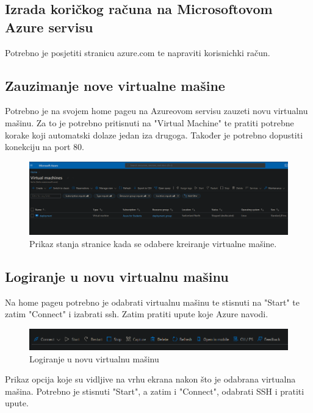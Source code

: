     \subsection{Izrada koričkog računa na Microsoftovom Azure servisu}
    Potrebno je posjetiti stranicu azure.com te napraviti korisnichki račun.

    \subsection{Zauzimanje nove virtualne mašine}
    Potrebno je na svojem home pageu na Azureovom servisu zauzeti novu virtualnu mašinu. Za to je potrebno pritisnuti na "Virtual Machine" te pratiti potrebne korake koji automatski dolaze jedan iza drugoga. Također je potrebno dopustiti konekciju na port 80.
    \begin{figure}[H]
        \includegraphics[width=\textwidth]{slike/deploy/create_vm.png} %
        \caption{Prikaz stanja stranice kada se odabere kreiranje virtualne mašine.}
        \label{fig:struktura} %
    \end{figure}

    \subsection{Logiranje u novu virtualnu mašinu}
    Na home pageu potrebno je odabrati virtualnu mašinu te stisnuti na "Start" te zatim "Connect" i izabrati ssh. Zatim pratiti upute koje Azure navodi.
    \begin{figure}[H]
        \includegraphics[width=\textwidth]{slike/deploy/connect.png} %
        \caption{Logiranje u novu virtualnu mašinu}
        \label{fig:struktura} %
    \end{figure}
    Prikaz opcija koje su vidljive na vrhu ekrana nakon što je odabrana virtualna mašina. Potrebno je stisnuti "Start", a zatim i "Connect", odabrati SSH i pratiti upute.

